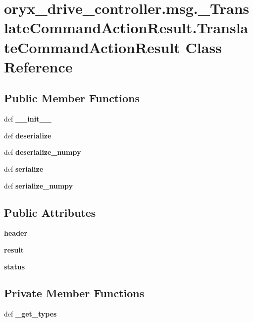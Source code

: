 \section{oryx\-\_\-drive\-\_\-controller.\-msg.\-\_\-\-Translate\-Command\-Action\-Result.\-Translate\-Command\-Action\-Result \-Class \-Reference}
\label{classoryx__drive__controller_1_1msg_1_1__TranslateCommandActionResult_1_1TranslateCommandActionResult}
\subsection*{\-Public \-Member \-Functions}
\begin{DoxyCompactItemize}
\item 
def {\bf \-\_\-\-\_\-init\-\_\-\-\_\-}
\item 
def {\bf deserialize}
\item 
def {\bf deserialize\-\_\-numpy}
\item 
def {\bf serialize}
\item 
def {\bf serialize\-\_\-numpy}
\end{DoxyCompactItemize}
\subsection*{\-Public \-Attributes}
\begin{DoxyCompactItemize}
\item 
{\bf header}
\item 
{\bf result}
\item 
{\bf status}
\end{DoxyCompactItemize}
\subsection*{\-Private \-Member \-Functions}
\begin{DoxyCompactItemize}
\item 
def {\bf \-\_\-get\-\_\-types}
\end{DoxyCompactItemize}
